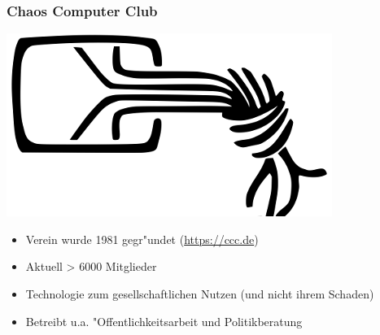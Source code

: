 \begin{frame}
    \frametitle{Chaos Computer Club}
    \begin{center}
	\includegraphics[height=0.2\textheight]{../../img/chaosknoten.png}
    \end{center}	
    \begin{itemize}
      \item<1-> Verein wurde 1981 gegr"undet (\url{https://ccc.de})
      \item<2-> Aktuell > 6000 Mitglieder
      \item<3-> Technologie zum gesellschaftlichen Nutzen (und nicht ihrem Schaden)
      \item<4-> Betreibt u.a. "Offentlichkeitsarbeit und Politikberatung
    \end{itemize}
\end{frame}

